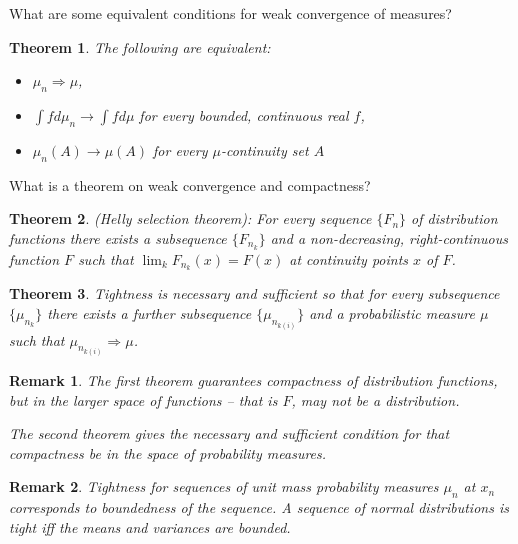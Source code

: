 \documentclass[avery5388,grid,frame]{flashcards}
\newtheorem*{theorem}{Theorem}
\newtheorem*{remark}{Remark}
\begin{document}
\begin{flashcard}
    {What are some equivalent conditions for weak convergence of measures?}
    \begin{theorem}
        The following are equivalent:
        \begin{itemize}
            \item $\mu_n \Rightarrow \mu$,
            \item $\int f d\mu_n \rightarrow \int f d\mu$ for every bounded, continuous real $f$,
            \item $\mu_n(A) \rightarrow \mu(A)$ for every $\mu$-continuity set $A$
        \end{itemize}
    \end{theorem}
\end{flashcard}


\begin{flashcard}
    {What is a theorem on weak convergence and compactness?}
    \begin{theorem}
        (Helly selection theorem): For every sequence $\{ F_n \}$ of distribution functions there exists a subsequence $\{ F_{n_k} \}$ and a non-decreasing, right-continuous function $F$ such that $\lim_k F_{n_k}(x) = F(x)$ at continuity points $x$ of $F$.
    \end{theorem}

    \begin{theorem}
        Tightness is necessary and sufficient so that for every subsequence $\{ \mu_{n_k} \}$ there exists a further subsequence $\{ \mu_{n_{k(i)}} \}$ and a probabilistic measure $\mu$ such that $\mu_{n_{k(i)}} \Rightarrow \mu$.
    \end{theorem}

    \begin{remark}
        The first theorem guarantees compactness of distribution functions, but in the larger space of functions -- that is $F$, may not be a distribution.

        The second theorem gives the necessary and sufficient condition for that compactness be in the space of probability measures.
    \end{remark}

    \begin{remark}
        Tightness for sequences of unit mass probability measures $\mu_n$ at $x_n$ corresponds to boundedness of the sequence. A sequence of normal distributions is tight iff the means and variances are bounded.
    \end{remark}
\end{flashcard}
\end{document}

